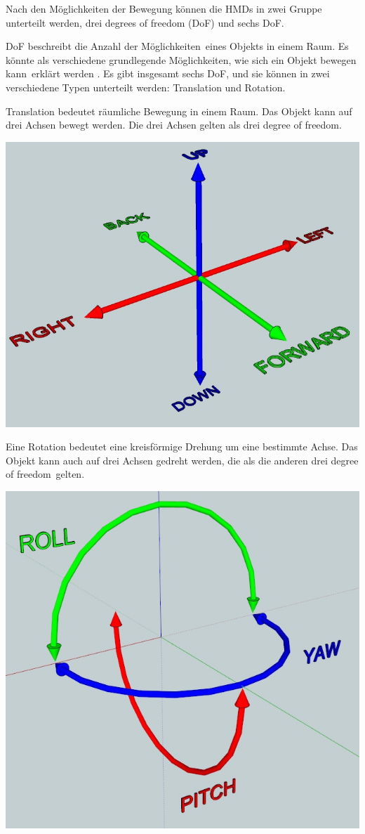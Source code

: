   Nach den Möglichkeiten der Bewegung können die HMDs in zwei Gruppe unterteilt werden, drei degrees of freedom (DoF) und sechs DoF.
  
  DoF beschreibt die \glqq Anzahl der Möglichkeiten\grqq\ eines Objekts in einem Raum. Es könnte als \glqq verschiedene grundlegende Möglichkeiten, wie sich ein Objekt bewegen kann\grqq\ erklärt werden \citep{25}. Es gibt insgesamt sechs DoF, und sie können in zwei verschiedene Typen unterteilt werden: Translation und Rotation.
  
  Translation bedeutet räumliche Bewegung in einem Raum. Das Objekt kann auf drei Achsen bewegt werden. Die drei Achsen gelten als drei \glqq degree of freedom\grqq .
  
  \includegraphics[width=\textwidth]{images/translations-diagram.jpg}
  
  Eine Rotation bedeutet eine kreisförmige Drehung um eine bestimmte Achse. Das Objekt kann auch auf drei Achsen gedreht werden, die als die anderen drei \glqq degree of freedom\grqq\ gelten.
  
  \includegraphics[width=\textwidth]{images/rotations-diagram.jpg}
  
